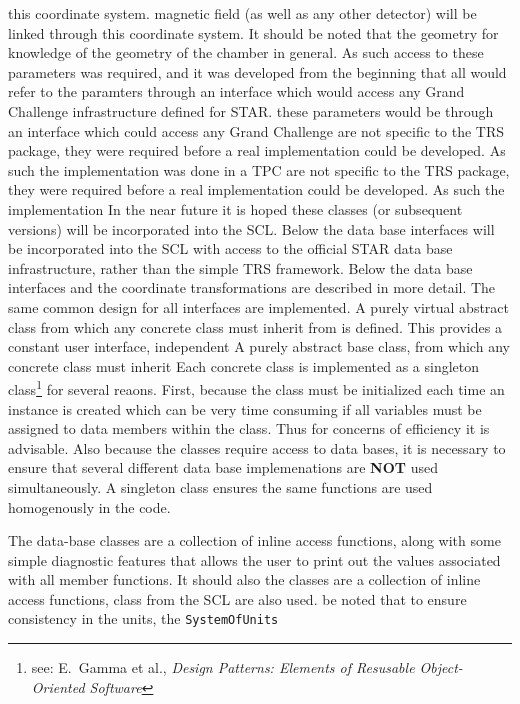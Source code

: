 \documentclass[twoside]{article}
\newcommand{\name}[1]{\textsf{#1}}%
\newcommand{\comp}[1]{\texttt{#1}}%
\begin{document}
this coordinate system.
magnetic field (as well as any other detector) will be linked through
this coordinate system.  It should be noted that the geometry for
knowledge of the geometry of the chamber in general.  As such access
to these parameters was required, and it was developed from the
beginning that all would refer to the paramters through an interface
which would access any Grand Challenge 
infrastructure defined for STAR.
these parameters would be through an interface
which could access any Grand Challenge 
are not specific to the \name{TRS} package, they were required before a 
real implementation
could be developed.  As such the implementation was done in a TPC
are not specific to the \name{TRS} package, they were required before
a  real implementation could be developed.  As such the implementation
In the near future it is hoped these classes (or subsequent versions) 
will be incorporated into the SCL.   Below the data base interfaces
will be incorporated into the \name{SCL} with access to the official
STAR data base infrastructure, rather than the simple \name{TRS} framework.
Below the data base interfaces
and the coordinate transformations are described in more detail.
The same common design for all interfaces are implemented.  A purely
virtual abstract class from which any concrete class must inherit
from is defined.  This provides a constant user interface, independent
A purely abstract base class, from which any concrete class must inherit
Each concrete class is implemented as
a singleton class\footnote{see: E.~Gamma et al., {\em Design Patterns: Elements of Resusable Object-Oriented Software}}
for several reaons.  
 First, because the class must be initialized each
time an instance is created which can be very time consuming if
all variables must be assigned to data members within the class.  Thus
for concerns of efficiency it is advisable.  Also because the classes
require access to data bases, it is necessary to ensure that
several different data base implemenations are {\bf NOT} used simultaneously.
A singleton class ensures the same functions are used homogenously
in the code.

The data-base classes are a collection of inline access functions,
along with some simple diagnostic features that allows the user to print out
the values associated with all member functions.  It should also
the classes are a collection of inline access functions,
class from the SCL   are also
used. 
be noted that to ensure consistency in the units, the \comp{SystemOfUnits}
\end{document}
